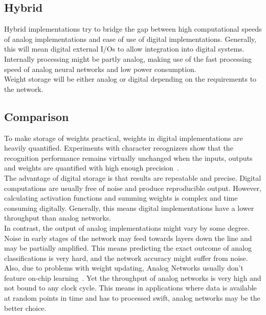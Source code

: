 \documentclass[conference]{IEEEtran}
\begin{document}
    \subsection{Hybrid}

    Hybrid implementations try to bridge the gap between high computational speeds of analog implementations and ease of use of digital implementations.
    Generally, this will mean digital external I/Os to allow integration into digital systems.\\
    Internally processing might be partly analog, making use of the fast processing speed of analog neural networks and low power consumption.\\
    Weight storage will be either analog or digital depending on the requirements to the network.

    \subsection{Comparison}

    To make storage of weights practical, weights in digital implementations are heavily quantified.
    Experiments with character recognizers show that the recognition performance remains virtually unchanged when the inputs, outputs and
    weights are quantified with high enough precision~\cite{gupta2015deep}.\\
    The advantage of digital storage is that results are repeatable and precise.
    Digital computations are usually free of noise and produce reproducible output.
    However, calculating activation functions and summing weights is complex and time consuming digitally.
    Generally, this means digital implementations have a lower throughput than analog networks.\\

    In contrast, the output of analog implementations might vary by some degree.
    Noise in early stages of the network may feed towards layers down the line and may be partially amplified.
    This means predicting the exact outcome of analog classifications is very hard, and the network accuracy might suffer from noise.
    Also, due to problems with weight updating, Analog Networks usually don't feature on-chip learning~\cite{ms1990digital}.
    Yet the throughput of analog networks is very high and not bound to any clock cycle.
    This means in applications where data is available at random points in time and has to processed swift, analog networks may be the better choice.
\end{document}
